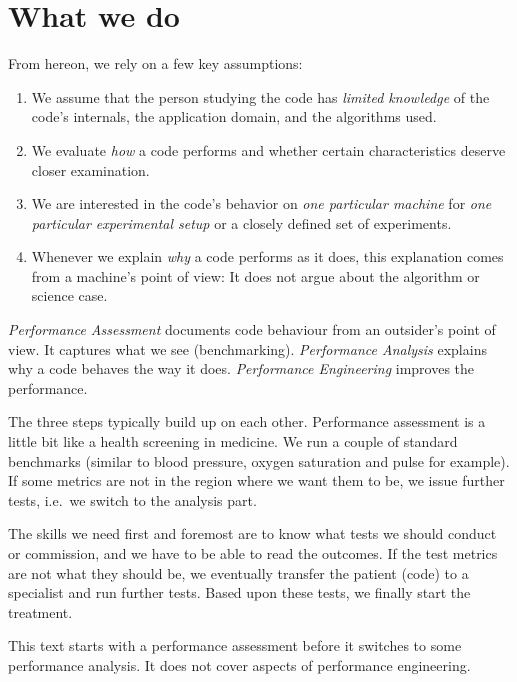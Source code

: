 \section{What we do}
\label{section:terminology:what-we-do}

From hereon, we rely on a few key assumptions:

\begin{enumerate}
\item We assume that the person studying the code has \emph{limited knowledge} of the code's internals, the application domain, and the algorithms used.
\item We evaluate \emph{how} a code performs and whether certain characteristics deserve closer examination.
\item We are interested in the code's behavior on \emph{one particular machine} for \emph{one particular experimental setup} or a closely defined set of experiments.
\item Whenever we explain \emph{why} a code performs as it does, this
explanation comes from a machine's point of view: It does not argue about the
algorithm or science case.
\end{enumerate}


\begin{doctrine}
 \emph{Performance Assessment} documents code behaviour from an outsider's point of view. It captures what we see (benchmarking).
 \emph{Performance Analysis} explains why a code behaves the way it does.
 \emph{Performance Engineering} improves the performance.
\end{doctrine}

\noindent
The three steps typically build up on each other.
Performance assessment is a little bit like a health screening in medicine.
We run a couple of standard benchmarks (similar to blood pressure, oxygen saturation and pulse for example). 
If some metrics are not in the region where we want them to be, we issue further tests, i.e.~we switch to the analysis part.

The skills we need first and foremost are to know what tests we should conduct or commission, and we have to be able to read the outcomes.
If the test metrics are not what they should be, we eventually transfer the patient (code) to a specialist and run further tests.
Based upon these tests, we finally start the treatment. 

\begin{readerguide}
 This text starts with a performance assessment before it switches to some performance analysis.
 It does not cover aspects of performance engineering.
\end{readerguide}

